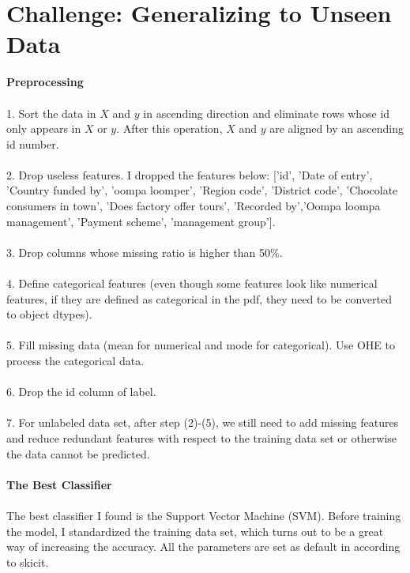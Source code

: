 \documentclass{article}
\begin{document}
        \section{Challenge: Generalizing to Unseen Data}
        \textbf{Preprocessing}\\\\
        1. Sort the data in $X$ and $y$ in ascending direction and eliminate rows whose id only appears in $X$ or $y$. After this operation, $X$ and $y$ are aligned by an ascending id number.\\\\
        2. Drop useless features. I dropped the features below: ['id', 'Date of entry', 'Country funded by', 'oompa loomper', 'Region code', 'District code', 'Chocolate consumers in town', 'Does factory offer tours', 'Recorded by','Oompa loompa management', 'Payment scheme', 'management group'].\\\\
        3. Drop columns whose missing ratio is higher than 50\%.\\\\
        4. Define categorical features (even though some features look like numerical features, if they are defined as categorical in the pdf, they need to be converted to object dtypes).\\\\
        5. Fill missing data (mean for numerical and mode for categorical). Use OHE to process the categorical data.\\\\
        6. Drop the id column of label.\\\\
        7. For unlabeled data set, after step (2)-(5), we still need to add missing features and reduce redundant features with respect to the training data set or otherwise the data cannot be predicted.\\\\
        
        \noindent 
        \textbf{The Best Classifier}\\\\
        The best classifier I found is the Support Vector Machine (SVM). Before training the model, I standardized the training data set, which turns out to be a great way of increasing the accuracy. All the parameters are set as default in according to skicit. 
        
\end{document}
